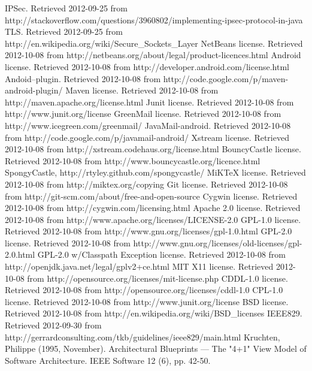 \documentclass[12pt]{report}
\begin{document}
\begin{thebibliography}{99}
 IPSec. Retrieved 2012-09-25 from http://stackoverflow.com/questions/3960802/implementing-ipsec-protocol-in-java
 TLS. Retrieved 2012-09-25 from http://en.wikipedia.org/wiki/Secure\_Sockets\_Layer
 NetBeans license. Retrieved 2012-10-08 from http://netbeans.org/about/legal/product-licences.html
 Android license. Retrieved 2012-10-08 from http://developer.android.com/license.html
 Andoid--plugin. Retrieved 2012-10-08 from http://code.google.com/p/maven-android-plugin/
 Maven license. Retrieved 2012-10-08 from http://maven.apache.org/license.html
 Junit license. Retrieved 2012-10-08 from http://www.junit.org/license
 GreenMail license. Retrieved 2012-10-08 from http://www.icegreen.com/greenmail/
 JavaMail-android. Retrieved 2012-10-08 from http://code.google.com/p/javamail-android/
 Xstream license. Retrieved 2012-10-08 from http://xstream.codehaus.org/license.html
 BouncyCastle license. Retrieved 2012-10-08 from http://www.bouncycastle.org/licence.html
 SpongyCastle, http://rtyley.github.com/spongycastle/
 MiKTeX license. Retrieved 2012-10-08 from http://miktex.org/copying
 Git license. Retrieved 2012-10-08 from http://git-scm.com/about/free-and-open-source
 Cygwin license. Retrieved 2012-10-08 from http://cygwin.com/licensing.html
 Apache 2.0 license. Retrieved 2012-10-08 from http://www.apache.org/licenses/LICENSE-2.0
 GPL-1.0 license. Retrieved 2012-10-08 from http://www.gnu.org/licenses/gpl-1.0.html
 GPL-2.0 license. Retrieved 2012-10-08 from http://www.gnu.org/licenses/old-licenses/gpl-2.0.html
 GPL-2.0 w/Classpath Exception license. Retrieved 2012-10-08 from http://openjdk.java.net/legal/gplv2+ce.html
 MIT X11 license. Retrieved 2012-10-08 from http://opensource.org/licenses/mit-license.php
 CDDL-1.0 license. Retrieved 2012-10-08 from http://opensource.org/licenses/cddl-1.0
 CPL-1.0 license. Retrieved 2012-10-08 from http://www.junit.org/license
 BSD license. Retrieved 2012-10-08 from http://en.wikipedia.org/wiki/BSD\_licenses
 IEEE829. Retrieved  2012-09-30 from http://gerrardconsulting.com/tkb/guidelines/ieee829/main.html
 Kruchten, Philippe (1995, November). Architectural Blueprints — The "4+1" View Model of Software Architecture. IEEE Software 12 (6), pp. 42-50.

\end{thebibliography}
\end{document}

